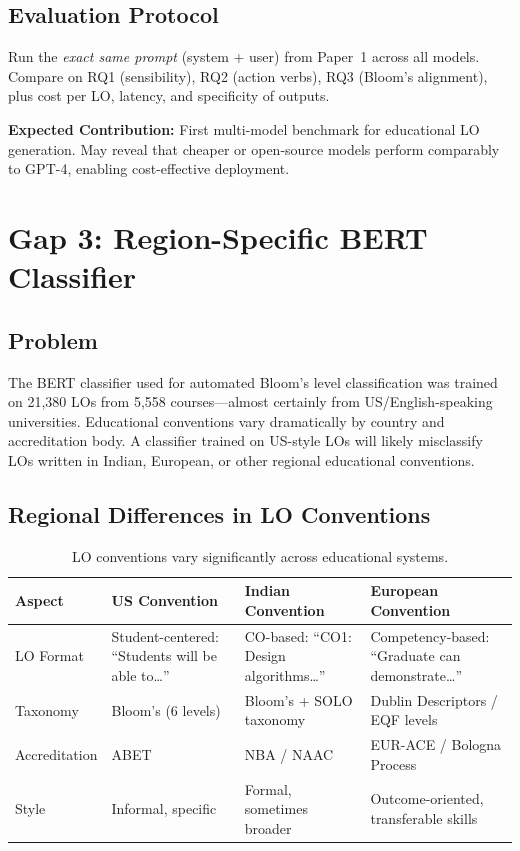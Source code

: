 \documentclass[11pt,a4paper]{article}
\begin{document}
\subsection{Evaluation Protocol}
Run the \textit{exact same prompt} (system + user) from Paper~1 across all models. Compare on RQ1 (sensibility), RQ2 (action verbs), RQ3 (Bloom's alignment), plus cost per LO, latency, and specificity of outputs.

\begin{notebox}
\textbf{Expected Contribution:} First multi-model benchmark for educational LO generation. May reveal that cheaper or open-source models perform comparably to GPT-4, enabling cost-effective deployment.
\end{notebox}

\section{Gap 3: Region-Specific BERT Classifier}

\subsection{Problem}
The BERT classifier used for automated Bloom's level classification \cite{li2022} was trained on 21,380 LOs from 5,558 courses---almost certainly from US/English-speaking universities. Educational conventions vary dramatically by country and accreditation body. A classifier trained on US-style LOs will likely misclassify LOs written in Indian, European, or other regional educational conventions.

\subsection{Regional Differences in LO Conventions}

\begin{table}[H]
\centering
\caption{LO conventions vary significantly across educational systems.}
\label{tab:regions}
\begin{tabular}{@{}lp{3.2cm}p{3.2cm}p{3.5cm}@{}}
\toprule
\textbf{Aspect} & \textbf{US Convention} & \textbf{Indian Convention} & \textbf{European Convention} \\
\midrule
LO Format & Student-centered: ``Students will be able to\ldots'' & CO-based: ``CO1: Design algorithms\ldots'' & Competency-based: ``Graduate can demonstrate\ldots'' \\
\addlinespace
Taxonomy & Bloom's (6 levels) & Bloom's + SOLO taxonomy & Dublin Descriptors / EQF levels \\
\addlinespace
Accreditation & ABET & NBA / NAAC & EUR-ACE / Bologna Process \\
\addlinespace
Style & Informal, specific & Formal, sometimes broader & Outcome-oriented, transferable skills \\
\bottomrule
\end{tabular}
\end{table}
\end{document}

